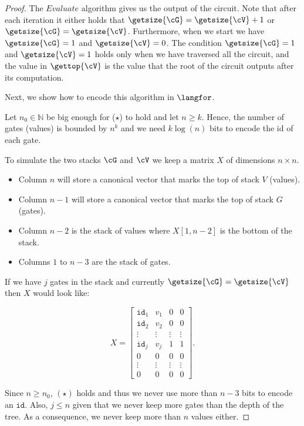 \begin{proof}
The $Evaluate$ algorithm gives us the output of the circuit. Note that after each iteration it either holds that $\getsize{\cG} =  \getsize{\cV} + 1$ or $\getsize{\cG} =  \getsize{\cV}$. Furthermore, when we start we have $\getsize{\cG}=1$ and $\getsize{\cV}=0$. The condition $\getsize{\cG}= 1$ and $\getsize{\cV}=1$ holds only when we have traversed all the circuit, and the value in $\gettop{\cV}$ is the value that the root of the circuit outputs after its computation.

Next, we show how to encode this algorithm in $\langfor$.

Let $n_0\in\mathbb{N}$ be big enough for ($\star$) to hold and let $n\geq k$. Hence, the number of gates (values) is bounded by $n^k$ and we need $k\log (n)$ bits to encode the id of each gate.

To simulate the two stacks $\cG$ and $\cV$ we keep a matrix $X$ of dimensions $n \times n$.

\begin{itemize}
	\item Column $n$ will store a canonical vector that marks the top of stack $V$ (values).
	\item Column $n-1$ will store a canonical vector that marks the top of stack $G$ (gates).
	\item Column $n-2$ is the stack of values where $X[1, n-2]$ is the bottom of the stack.
	\item Columns $1$ to $n-3$ are the stack of gates.
\end{itemize}

If we have $j$ gates in the stack and currently $\getsize{\cG}=\getsize{\cV}$ then $X$ would look like:

\[
X = \begin{bmatrix}
    \texttt{id}_1 & v_1 & 0 & 0 \\
    \texttt{id}_2 & v_2 & 0 & 0 \\
    \vdots & \vdots & \vdots & \vdots \\
    \texttt{id}_j & v_j & 1 & 1 \\
    0 & 0 & 0 & 0 \\
    \vdots & \vdots & \vdots & \vdots \\
     0 & 0 & 0 & 0
\end{bmatrix}.
\]

Since $n\geq n_0$, $(\star)$ holds and thus we never use more than $n-3$ bits to encode an $\texttt{id}$. Also, $j\leq n$ given that we never keep more gates than the depth of the tree. As a consequence, we never keep more than $n$ values either.


\end{proof}
